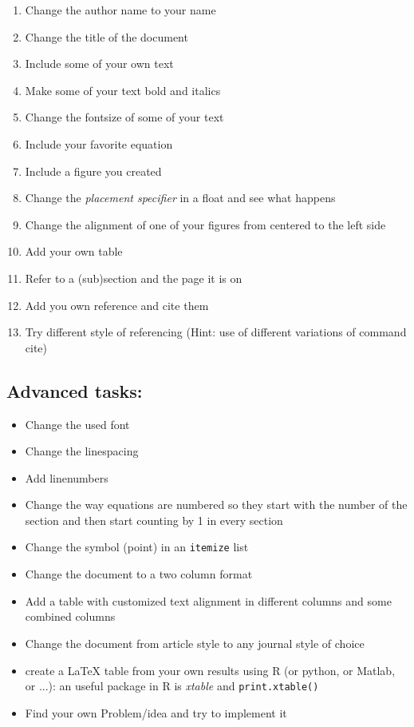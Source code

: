 \documentclass{article}
\numberwithin{equation}{section}
\begin{document}
\begin{enumerate}
	\item Change the author name to your name
	\item Change the title of the document
    \item Include some of your own text
    \item Make some of your text bold and italics
    \item Change the fontsize of some of your text
    \item Include your favorite equation
    \item Include a figure you created
    \item Change the \textit{placement specifier} in a float and see what happens
    \item Change the alignment of one of your figures from centered to the left side
    \item Add your own table
    \item Refer to a (sub)section and the page it is on
    \item Add you own reference and cite them
    \item Try different style of referencing (Hint: use of different variations of command cite)
\end{enumerate}

\subsection{Advanced tasks:}

\begin{itemize}
    \item Change the used font
    \item Change the linespacing
    \item Add linenumbers
    \item Change the way equations are numbered so they start with the number of the section and then start counting by 1 in every section
    \item Change the symbol (point) in an \texttt{itemize} list
	\item Change the document to a two column format
    \item Add a table with customized text alignment in different columns and some combined columns
    \item Change the document from article style to any journal style of choice
    \item create a \LaTeX{} table from your own results using R (or python, or Matlab, or ...): an useful package in R is \textit{xtable} and \texttt{print.xtable()}
    \item Find your own Problem/idea and try to implement it

\end{itemize}
\end{document}
